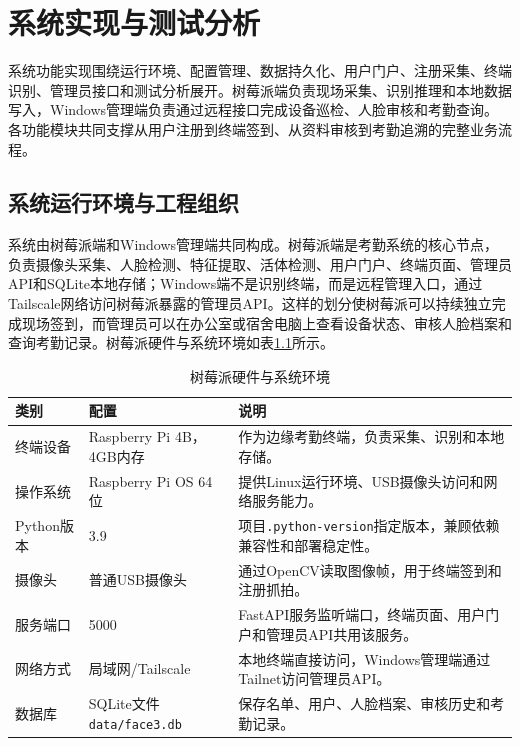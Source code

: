 \chapter{系统实现与测试分析}

系统功能实现围绕运行环境、配置管理、数据持久化、用户门户、注册采集、终端识别、管理员接口和测试分析展开。树莓派端负责现场采集、识别推理和本地数据写入，Windows管理端负责通过远程接口完成设备巡检、人脸审核和考勤查询。各功能模块共同支撑从用户注册到终端签到、从资料审核到考勤追溯的完整业务流程。

\section{系统运行环境与工程组织}

系统由树莓派端和Windows管理端共同构成。树莓派端是考勤系统的核心节点，负责摄像头采集、人脸检测、特征提取、活体检测、用户门户、终端页面、管理员API和SQLite本地存储；Windows端不是识别终端，而是远程管理入口，通过Tailscale网络访问树莓派暴露的管理员API。这样的划分使树莓派可以持续独立完成现场签到，而管理员可以在办公室或宿舍电脑上查看设备状态、审核人脸档案和查询考勤记录。树莓派硬件与系统环境如表\ref{tab:pi_system_env}所示。

\begin{table}[H]
    \centering
    \caption{树莓派硬件与系统环境}
    \label{tab:pi_system_env}
    \begin{tabularx}{\textwidth}{p{3.6cm}p{4.2cm}X}
        \toprule
        \textbf{类别} & \textbf{配置} & \textbf{说明} \\
        \midrule
        终端设备 & Raspberry Pi 4B，4GB内存 & 作为边缘考勤终端，负责采集、识别和本地存储。 \\
        操作系统 & Raspberry Pi OS 64位 & 提供Linux运行环境、USB摄像头访问和网络服务能力。 \\
        Python版本 & 3.9 & 项目\texttt{.python-version}指定版本，兼顾依赖兼容性和部署稳定性。 \\
        摄像头 & 普通USB摄像头 & 通过OpenCV读取图像帧，用于终端签到和注册抓拍。 \\
        服务端口 & 5000 & FastAPI服务监听端口，终端页面、用户门户和管理员API共用该服务。 \\
        网络方式 & 局域网/Tailscale & 本地终端直接访问，Windows管理端通过Tailnet访问管理员API。 \\
        数据库 & SQLite文件\texttt{data/face3.db} & 保存名单、用户、人脸档案、审核历史和考勤记录。 \\
        \bottomrule
    \end{tabularx}
\end{table}

